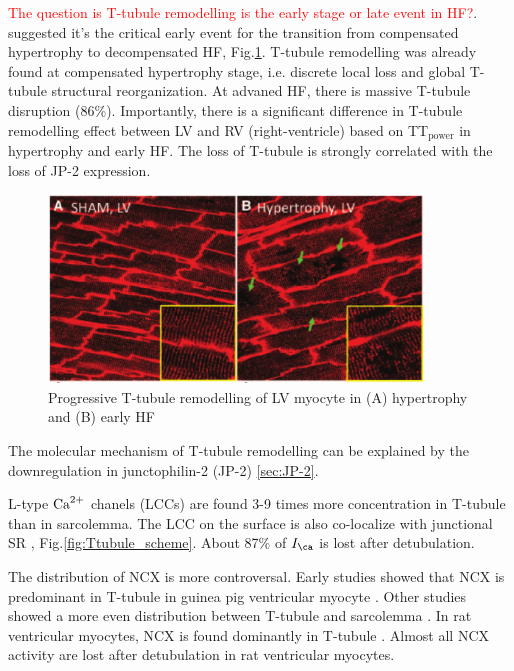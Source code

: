 \textcolor{red}{The question is T-tubule remodelling is the early stage or late
event in HF?}. \citep{wei2010} suggested it's the critical early event for the
transition from compensated hypertrophy to decompensated HF,
Fig.\ref{fig:Ttubule_remodelingWei2010}. T-tubule remodelling was already found
at compensated hypertrophy stage, i.e.
discrete local loss and global T-tubule structural reorganization. At advaned
HF, there is massive T-tubule disruption (86\%).
Importantly, there is a significant difference in T-tubule remodelling effect
between LV and RV (right-ventricle) based on TT$_\text{power}$ in hypertrophy
and early HF. The loss of T-tubule is strongly correlated with the loss of JP-2
expression.

\begin{figure}[hbt]
  \centerline{\includegraphics[height=5cm,
    angle=0]{./images/Ttubule_remodelling_Wei2010.eps}}
  \caption{Progressive T-tubule remodelling of LV myocyte in (A) hypertrophy
  and (B) early HF}
  \label{fig:Ttubule_remodelingWei2010}
\end{figure}


\begin{framed}
The molecular mechanism of T-tubule remodelling can be explained by the
downregulation in junctophilin-2 (JP-2) \ref{sec:JP-2}. 
\end{framed}

L-type ${\text{Ca}^{2+}}$ chanels (LCCs) are found 3-9 times more concentration in T-tubule
than in sarcolemma. The LCC on the surface is also co-localize with junctional
SR \citep{brette2003}, Fig.\ref{fig:Ttubule_scheme}. About 87\% of $I_\ca$ is
lost after detubulation.

The distribution of NCX is more controversal. Early studies showed that NCX is
predominant in T-tubule in guinea pig ventricular myocyte \citep{28}. Other
studies showed a more even distribution between T-tubule and sarcolemma
\citep{25,29}. In rat ventricular myocytes, NCX is found dominantly in T-tubule
\citep{26}. Almost all NCX activity are lost after detubulation in rat
ventricular myocytes.

